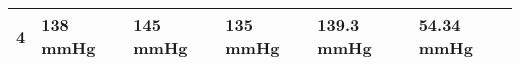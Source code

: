 \begin{table}[H]
\begin{tabular}{|l|l|l|l|l|l|}
		4                                                        & 138 mmHg                                                      & 145 mmHg                                                      & 135 mmHg                                                       & 139.3 mmHg                                             & 54.34 mmHg                                             \\ \hline
	\end{tabular}
\end{table}